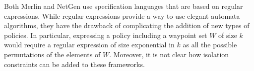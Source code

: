 Both Merlin and NetGen use specification languages that are based on regular expressions. 
While regular expressions provide a way to 
use elegant automata algorithms, they have the drawback of complicating the addition of new types of policies.
In particular, expressing a policy including a waypoint set $W$ of size $k$ would require a regular expression of size exponential
in $k$ as all the possible permutations of the elements of $W$.
Moreover, it is not clear how isolation constraints can be added to these frameworks.
